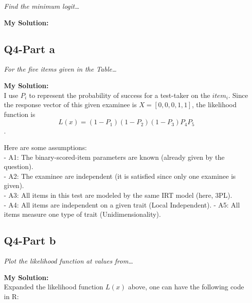 \documentclass[
]{article}
\begin{document}
\emph{Find the minimum logit\ldots{}}

\textbf{My Solution: }

\hypertarget{q4-part-a}{%
\subsection{Q4-Part a}\label{q4-part-a}}

\emph{For the five items given in the Table\ldots{}}

\textbf{My Solution: }\\
I use \(P_i\) to represent the probability of success for a test-taker
on the \(item_i\). Since the response vector of this given examinee is
\(X=[0,0,0,1,1]\), the likelihood function is
\[L(x) = (1-P_1)(1-P_2)(1-P_3)P_4P_5\].

Here are some assumptions:\\
- A1: The binary-scored-item parameters are known (already given by the
question).\\
- A2: The examinee are independent (it is satisfied since only one
examinee is given).\\
- A3: All items in this test are modeled by the same IRT model (here,
3PL).\\
- A4: All items are independent on a given trait (Local Independent). -
A5: All items measure one type of trait (Unidimensionality).

\hypertarget{q4-part-b}{%
\subsection{Q4-Part b}\label{q4-part-b}}

\emph{Plot the likelihood function at values from\ldots{}}

\textbf{My Solution: }\\
Expanded the likelihood function \(L(x)\) above, one can have the
following code in R:
\end{document}
